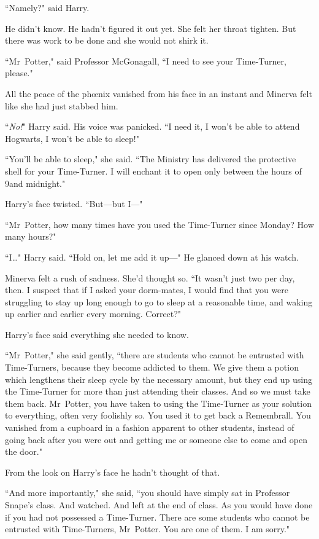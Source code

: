 ``Namely?" said Harry.

He didn't know. He hadn't figured it out yet. She felt her throat tighten. But there was work to be done and she would not shirk it.

``Mr~Potter," said Professor McGonagall, ``I need to see your Time-Turner, please."

All the peace of the phœnix vanished from his face in an instant and Minerva felt like she had just stabbed him.

``\emph{No!}" Harry said. His voice was panicked. ``I need it, I won't be able to attend Hogwarts, I won't be able to sleep!"

``You'll be able to sleep," she said. ``The Ministry has delivered the protective shell for your Time-Turner. I will enchant it to open only between the hours of 9\pm and midnight."

Harry's face twisted. ``But—but I—"

``Mr~Potter, how many times have you used the Time-Turner since Monday? How many hours?"

``I{\ldots}" Harry said. ``Hold on, let me add it up—" He glanced down at his watch.

Minerva felt a rush of sadness. She'd thought so. ``It wasn't just two per day, then. I suspect that if I asked your dorm-mates, I would find that you were struggling to stay up long enough to go to sleep at a reasonable time, and waking up earlier and earlier every morning. Correct?"

Harry's face said everything she needed to know.

``Mr~Potter," she said gently, ``there are students who cannot be entrusted with Time-Turners, because they become addicted to them. We give them a potion which lengthens their sleep cycle by the necessary amount, but they end up using the Time-Turner for more than just attending their classes. And so we must take them back. Mr~Potter, you have taken to using the Time-Turner as your solution to everything, often very foolishly so. You used it to get back a Remembrall. You vanished from a cupboard in a fashion apparent to other students, instead of going back after you were out and getting me or someone else to come and open the door."

From the look on Harry's face he hadn't thought of that.

``And more importantly," she said, ``you should have simply sat in Professor Snape's class. And watched. And left at the end of class. As you would have done if you had not possessed a Time-Turner. There are some students who cannot be entrusted with Time-Turners, Mr~Potter. You are one of them. I am sorry."

